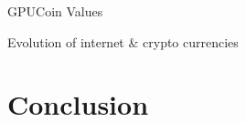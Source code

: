 \documentclass[10pt,handout]{beamer}
\begin{document}
\begin{frame}[t]{ GPUCoin Values}


\end{frame}
 

\begin{frame}[t]{Evolution of internet \& crypto currencies}
 
 
\end{frame} 
 
 


\section{Conclusion}
\end{document}
